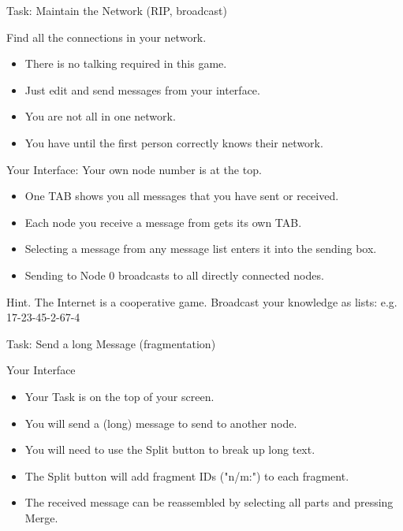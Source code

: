 \documentclass[svgnames]{beamer}
\begin{document}
\begin{frame}{Task: Maintain the Network (RIP, broadcast)}
\vspace*{-2mm}
\begin{alertblock}{Find all the connections in your network.}
\begin{itemize}
\item \alert{There is no talking required in this game}.
\item Just edit and send messages from your interface.
\item You are \alert{not all in one network}.
\item \large You have until the first person correctly knows their network.
\end{itemize}
\end{alertblock}

\vspace*{-2mm}
\begin{block}{Your Interface: Your own node number is at the top.}
\begin{itemize}
\item One TAB shows you all messages that you have sent or received.
\item Each node you receive a message from gets its own TAB.
\item Selecting a message from any message list enters it into the sending box.
\item Sending to Node 0 broadcasts to all \alert{directly} connected nodes.
\end{itemize}
\end{block}
\pause
\begin{alertblock}{Hint. The Internet is a cooperative game.}
{Broadcast your knowledge as lists: e.g. 17-23-45-2-67-4}
\end{alertblock}
\end{frame}

\begin{frame}{Task: Send a long Message (fragmentation)}
\begin{block}{Your Interface}
\begin{itemize}
\item Your Task is on the top of your screen.
\item You will send a (long) message to send to another node.
\item You will need to use the \alert{Split} button to break up long text.
\item The \alert{Split} button will add fragment IDs (\alert{"n/m:"}) to each fragment.
\item The received message can be reassembled by selecting all parts and pressing \alert{Merge}.
\end{itemize}
\end{block}
\end{frame}
\end{document}

